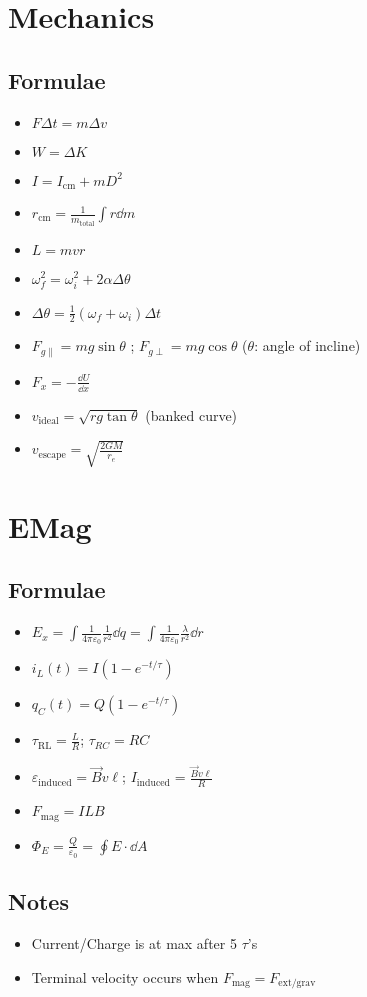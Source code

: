 \documentclass{article}
\begin{document}
  \section{Mechanics}
  \subsection{Formulae}
  \begin{itemize}
    \item $F\Delta t = m\Delta v$
    \item $W=\Delta K$
    \item $I=I_{\mathrm{cm}}+mD^2$
    \item $r_{\mathrm{cm}}=\frac{1}{m_{\mathrm{total}}}\int r\dd m$
    \item $L=mvr$
    \item $\omega_f^2=\omega_i^2+2\alpha\Delta\theta$
    \item $\Delta\theta=\frac{1}{2}(\omega_f+\omega_i)\Delta t$
    \item $F_{g\parallel}=mg\sin\theta$ ; $F_{g\perp}=mg\cos\theta$ ($\theta$: angle of incline)
    \item $F_x=-\frac{\dd U}{\dd x}$
    \item $v_{\mathrm{ideal}}=\sqrt{rg \tan\theta}$ (banked curve)
    \item $v_{\mathrm{escape}}=\sqrt{\frac{2GM}{r_e}}$
  \end{itemize}
  \section{EMag}
  \subsection{Formulae}
  \begin{itemize}
    \item $E_x=\int\frac{1}{4\pi\varepsilon_0}\frac{1}{r^2}\dd q = \int \frac{1}{4\pi\varepsilon_0}\frac{\lambda}{r^2}\dd r$
    \item $i_L(t)=I(1-e^{-t/\tau})$
    \item $q_C(t)=Q(1-e^{-t/\tau})$
    \item $\tau_{\mathrm{RL}}=\frac{L}{R}$; $\tau_{RC}=RC$
    \item $\varepsilon_{\mathrm{induced}}=\vec{B}v\ell$; $I_{\mathrm{induced}}=\frac{\vec{B}v\ell}{R}$
    \item $F_{\mathrm{mag}}=ILB$
    \item $\Phi_E=\frac{Q}{\varepsilon_0}=\oint E\cdot\dd A$
  \end{itemize}
  \subsection{Notes}
  \begin{itemize}
    \item Current/Charge is at max after 5 $\tau$'s
    \item Terminal velocity occurs when $F_{\mathrm{mag}}=F_{\mathrm{ext/grav}}$
  \end{itemize}
\end{document}

